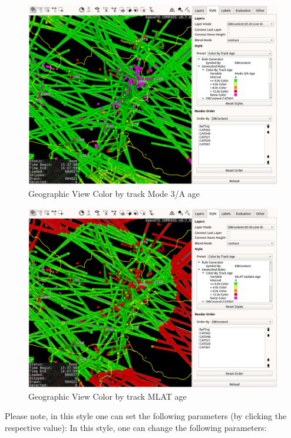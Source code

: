 \begin{figure}[H]
    \hspace*{-1.5cm}
    \includegraphics[width=17cm,frame]{figures/geoview_style_track_m3a_age.png}
  \caption{Geographic View Color by track Mode 3/A age}
\end{figure}

\begin{figure}[H]
    \hspace*{-2.5cm}
    \includegraphics[width=19cm,frame]{figures/geoview_style_track_mlt_age.png}
  \caption{Geographic View Color by track MLAT age}
\end{figure}

Please note, in this style one can set the following parameters (by clicking the respective value):
In this style, one can change the following parameters:

